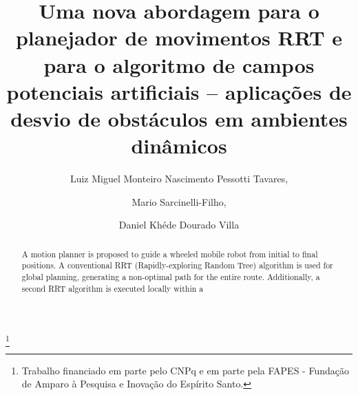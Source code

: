\documentclass[a4paper]{IEEEconf}
\begin{document}
\title{Uma nova abordagem para o planejador de movimentos RRT e para o algoritmo de campos potenciais artificiais -- aplicações de desvio de obstáculos em ambientes dinâmicos}

\thanks[footnoteinfo]{Trabalho financiado em parte pelo CNPq e em parte pela FAPES - Fundação de Amparo à Pesquisa e Inovação do Espírito Santo.}

\author{Luiz Miguel Monteiro Nascimento Pessotti Tavares,}
\author{Mario Sarcinelli-Filho,}
\author[Fourth]{Daniel Khéde Dourado Villa}

\begin{abstract}
	A motion planner is proposed to guide a wheeled mobile robot from initial to final positions. A conventional RRT (Rapidly-exploring Random Tree) algorithm is used for global planning, generating a non-optimal path for the entire route. Additionally, a second RRT algorithm is executed locally within a
\end{abstract}
\end{document}
